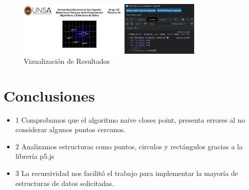 \documentclass{article}
\begin{document}
\begin{figure}[H]
\centering
\includegraphics[width=0.8\textwidth]{img/Resultado10.jpg}
\caption{Vizualización de Resultados}
\end{figure}


\section{Conclusiones}

\begin{itemize}
            \item 1 Comprobamos que el algoritmo naive closes point, presenta errores al no considerar algunos puntos cercanos.
\end{itemize}
\begin{itemize}
            \item 2 Analizamos estructuras como puntos, circulos y rectángulos gracias a la librería p5.js
\end{itemize}

\begin{itemize}
            \item 3 La recursividad nos facilitó el trabajo para implementar la mayoría de estructuras de datos solicitadas.
\end{itemize}  

	
	
	
\end{document}
